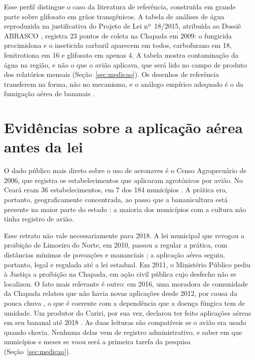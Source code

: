 Esse perfil distingue o caso da literatura de referência, construída em grande
parte sobre glifosato em grãos transgênicos. A tabela de análises de água
reproduzida na justificativa do Projeto de Lei nº~18/2015, atribuída ao Dossiê
ABRASCO \cite{ceara2015pl18}, registra 23 pontos de coleta na Chapada em 2009: o fungicida
procimidona e o inseticida carbaril aparecem em todos, carbofurano em 18,
fenitrotiona em 16 e glifosato em apenas 4. A tabela mostra contaminação da
água na região, e não o que o avião aplicava, que será lido no campo de
produto dos relatórios mensais (Seção~\ref{sec:medicao}). Os desenhos de referência transferem na forma, não no
mecanismo, e o análogo empírico adequado é o da fumigação aérea de bananais
\cite{calzada2023bananas}.

\section{Evidências sobre a aplicação aérea antes da lei}
\label{sec:onde-aviao}

O dado público mais direto sobre o uso de aeronaves é o Censo Agropecuário de
2006, que registra os estabelecimentos que aplicaram agrotóxicos por avião. No
Ceará eram 36 estabelecimentos, em 7 dos 184 municípios
\cite{ibge2006censoagro}. A prática era, portanto, geograficamente concentrada,
ao passo que a bananicultura está presente na maior parte do estado
\cite{ibgepam}: a maioria dos municípios com a cultura não tinha registro de
avião.

Esse retrato não vale necessariamente para 2018. A lei municipal que revogou
a proibição de Limoeiro do Norte, em 2010, passou a regular a prática, com
distâncias mínimas de povoações e mananciais \cite{limoeiro2010lei1511}; a
aplicação aérea seguiu, portanto, legal e regulada até a lei estadual. Em
2011, o Ministério Público pediu à Justiça a proibição na Chapada, em ação
civil pública \cite{mpt2011apodi} cujo desfecho não se localizou. O fato mais relevante é outro: em 2016, uma
moradora de comunidade da Chapada relatou que não havia novas aplicações
desde 2012, por causa da pouca chuva \cite{agenciabrasil2016ceara}, o que é
coerente com a dependência que a doença fúngica tem de umidade. Um produtor do
Cariri, por sua vez, declarou ter feito aplicações aéreas em seu bananal até
2018 \cite{globorural2021bananais}. As duas leituras são compatíveis se o
avião era usado quando chovia. Nenhuma delas vem de registro administrativo, e saber em que municípios e
meses se voou será a primeira tarefa da pesquisa (Seção~\ref{sec:medicao}).
